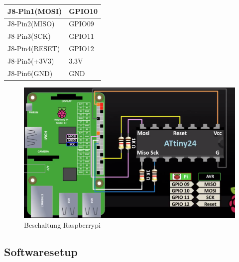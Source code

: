 \documentclass[11pt]{article}
\begin{document}
\begin{table}\label{tab:flashConnects}
	\begin{tabular}{l|l}
		J8-Pin1(MOSI)& GPIO10 \\\hline
		J8-Pin2(MISO)& GPIO09	\\\hline
		J8-Pin3(SCK)& GPIO11 \\\hline
		J8-Pin4(RESET)& GPIO12 \\\hline
		J8-Pin5(+3V3)& 3.3V \\\hline
		J8-Pin6(GND)& GND 
	\end{tabular}
\end{table}
\begin{figure}[h]\label{fig:flashSetup}
	\includegraphics[width=1\textwidth]{graphics/flashen.png}
	\caption{Beschaltung Raspberrypi}
\end{figure}
\FloatBarrier
\subsection{Softwaresetup}
\end{document}
